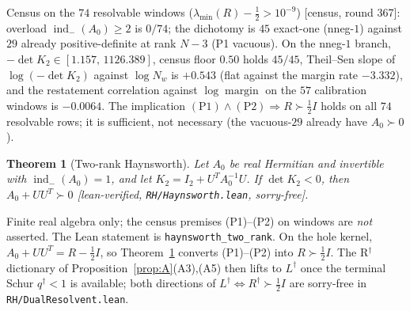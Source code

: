 \documentclass[11pt]{article}
\newtheorem{thm}{Theorem}
\theoremstyle{remark}
\newcommand{\Rd}{R^{\dagger}}
\newcommand{\Ld}{L^{\dagger}}
\newcommand{\half}{\tfrac12}
\newcommand{\gr}[1]{\textnormal{\small[#1]}}
\begin{document}
Census on the $74$ resolvable windows
($\lambda_{\min}(R)-\half>10^{-9}$) \gr{census, round 367}:
overload $\operatorname{ind}_{-}(A_{0})\ge2$ is $0/74$; the
dichotomy is $45$ exact-one (nneg-$1$) against $29$ already
positive-definite at rank $N-3$ (P1 vacuous).  On the nneg-$1$
branch, $-\det K_{2}\in[1.157,\,1126.389]$, census floor $0.50$
holds $45/45$, Theil--Sen slope of $\log(-\det K_{2})$ against
$\log N_{w}$ is $+0.543$ (flat against the margin rate $-3.332$),
and the restatement correlation against $\log\operatorname{margin}$
on the $57$ calibration windows is $-0.0064$.  The implication
$\mathrm{(P1)}\wedge\mathrm{(P2)}\Rightarrow R\succ\half I$ holds on
all $74$ resolvable rows; it is sufficient, not necessary (the
vacuous-$29$ already have $A_{0}\succ0$).

\begin{thm}[Two-rank Haynsworth]
\label{thm:haynsworth}
Let $A_{0}$ be real Hermitian and invertible with
$\operatorname{ind}_{-}(A_{0})=1$, and let
$K_{2}=I_{2}+U^{T}A_{0}^{-1}U$.  If $\det K_{2}<0$, then
$A_{0}+UU^{T}\succ0$
\gr{lean-verified, \texttt{RH/Haynsworth.lean}, sorry-free}.
\end{thm}

Finite real algebra only; the census premises (P1)--(P2) on windows
are \emph{not} asserted.  The Lean statement is
\texttt{haynsworth\_two\_rank}.  On the hole kernel,
$A_{0}+UU^{T}=R-\half I$, so Theorem~\ref{thm:haynsworth} converts
(P1)--(P2) into $R\succ\half I$.  The R$^{\dagger}$ dictionary of
Proposition~\ref{prop:A}(A3),(A5) then lifts to $\Ld$ once the
terminal Schur $q^{\dagger}<1$ is available; both directions of
$\Ld\iff\Rd\succ\half I$ are sorry-free in
\texttt{RH/DualResolvent.lean}.
\end{document}
